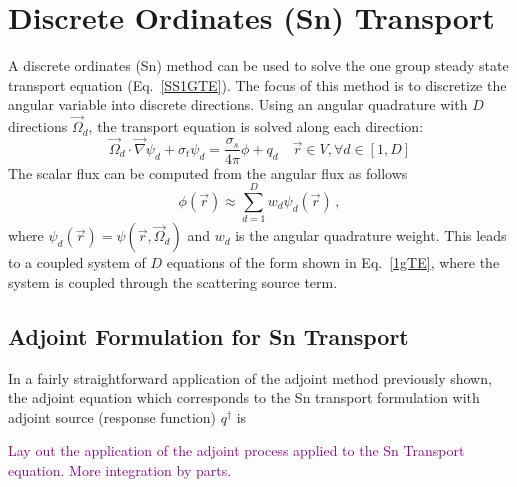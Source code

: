 \documentclass[12pt]{report}
\newcommand{\vr}{\vec{r}}
\newcommand{\vO}{\vec{\Omega}}
\newcommand{\grad}{\vec{\nabla}}
\newcommand{\sigt}{\sigma_t}
\newcommand{\sigs}{\sigma_s}
\newcommand{\angResp}{q^\dag}
\newcommand{\comment}[2]{\marginpar{\textcolor{#2}{$\star$}}\textcolor{#2}{#1}\newline}
\newcommand{\todo}[1]{\comment{#1}{purple}}
\newcommand{\todo}[1]{\phantom{a}}
\begin{document}
\section{Discrete Ordinates (Sn) Transport}
A discrete ordinates (Sn) method can be used to solve the one group steady state transport equation (Eq.~\eqref{SS1GTE}). The focus of this method is to discretize the angular variable into discrete directions. Using an angular quadrature with $D$ directions $\vO_d$, the transport equation is solved along each direction:
\begin{equation}
\label{1gTE}
\vO_d \cdot \grad \psi_d + \sigt \psi_d = \frac{\sigs}{4 \pi} \phi + q_d \quad \vr \in V , \forall d\in [1,D]
\end{equation}
%
The scalar flux can be computed from the angular flux as follows
\[
\phi(\vr) \approx \sum_{d=1}^D w_d \psi_d(\vr) \,,
\] 
where $\psi_d(\vr) = \psi(\vr, \vO_d)$ and $w_d$ is the angular quadrature weight. This leads to a coupled system of $D$ equations of the form shown in Eq.~\eqref{1gTE}, where the system is coupled through the scattering source term.



\subsection{Adjoint Formulation for Sn Transport}
In a fairly straightforward application of the adjoint method previously shown, the adjoint equation which corresponds to the Sn transport formulation with adjoint source (response function)
$\angResp$ is

\todo{Lay out the application of the adjoint process applied to the Sn Transport equation. More integration by parts.}
\end{document}

